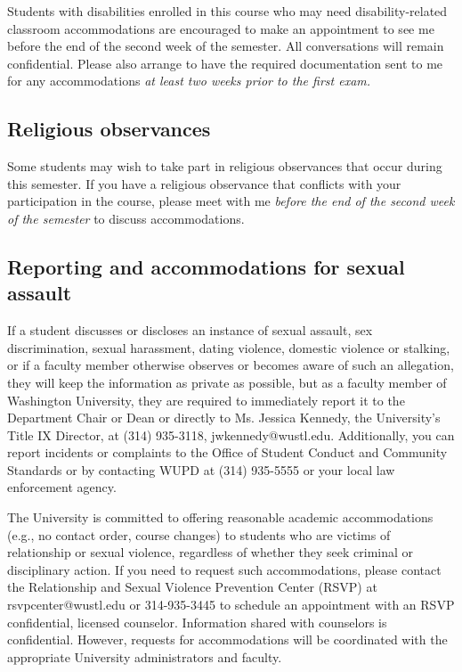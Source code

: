 \documentclass[11pt]{article}
\begin{document}
Students with disabilities enrolled in this course who may need
disability-related classroom accommodations are encouraged to make an
appointment to see me before the end of the second week of the
semester.  All conversations will remain confidential. Please also
arrange to have the required documentation sent to me for any
accommodations \emph{at least two weeks prior to the first exam.}

\subsection*{Religious observances}

Some students may wish to take part in religious observances that
occur during this semester. If you have a religious observance
that conflicts with your participation in the course, please meet with
me \emph{before the end of the second week of the semester} to discuss
accommodations.


\subsection*{Reporting and accommodations for sexual assault}

If a student discusses or discloses an instance of sexual assault, sex discrimination, sexual harassment, dating violence, domestic violence or stalking, or if a faculty member otherwise observes or becomes aware of such an allegation, they will keep the information as private as possible, but as a faculty member of Washington University, they are required to immediately report it to the Department Chair or Dean or directly to Ms. Jessica Kennedy, the University’s Title IX Director, at (314) 935-3118, jwkennedy@wustl.edu.  Additionally, you can report incidents or complaints to the Office of Student Conduct and Community Standards or by contacting WUPD at (314) 935-5555 or your local law enforcement agency. 

The University is committed to offering reasonable academic accommodations (e.g., no contact order, course changes) to students who are victims of relationship or sexual violence, regardless of whether they seek criminal or disciplinary action.  If you need to request such accommodations, please contact the Relationship and Sexual Violence Prevention Center (RSVP) at rsvpcenter@wustl.edu or 314-935-3445 to schedule an appointment with an RSVP confidential, licensed counselor. Information shared with counselors is confidential. However, requests for accommodations will be coordinated with the appropriate University administrators and faculty.  
\end{document}
